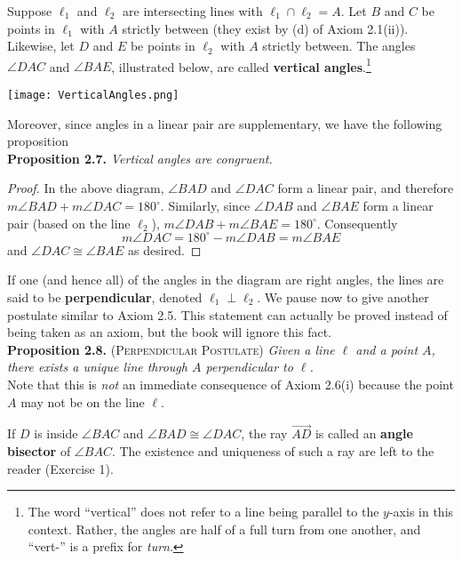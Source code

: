\documentclass[leqno]{book}
\begin{document}
Suppose $\ell_1$ and $\ell_2$ are intersecting lines with $\ell_1\cap\ell_2=A$.  Let $B$ and $C$ be points in $\ell_1$ with $A$ strictly between (they exist by (d) of Axiom 2.1(ii)).  Likewise, let $D$ and $E$ be points in $\ell_2$ with $A$ strictly between.  The angles $\angle DAC$ and $\angle BAE$, illustrated below, are called \textbf{vertical angles}.\footnote{The word ``vertical'' does not refer to a line being parallel to the $y$-axis in this context.  Rather, the angles are half of a full turn from one another, and ``vert-'' is a prefix for \emph{turn}.}
\begin{center}\texttt{[image: VerticalAngles.png]}\end{center}
Moreover, since angles in a linear pair are supplementary, we have the following proposition\\

\noindent\textbf{Proposition 2.7.} \emph{Vertical angles are congruent.}\\
\begin{proof}
In the above diagram, $\angle BAD$ and $\angle DAC$ form a linear pair, and therefore $m\angle BAD+m\angle DAC=180^\circ$.  Similarly, since $\angle DAB$ and $\angle BAE$ form a linear pair (based on the line $\ell_2$), $m\angle DAB+m\angle BAE=180^\circ$.  Consequently
$$m\angle DAC=180^\circ-m\angle DAB=m\angle BAE$$
and $\angle DAC\cong\angle BAE$ as desired.
\end{proof}

\noindent If one (and hence all) of the angles in the diagram are right angles, the lines are said to be \textbf{perpendicular}, denoted $\ell_1\perp\ell_2$.  We pause now to give another postulate similar to Axiom 2.5.  This statement can actually be proved instead of being taken as an axiom, but the book will ignore this fact.\\ %

\noindent\textbf{Proposition 2.8.} \textsc{(Perpendicular Postulate)} \emph{Given a line $\ell$ and a point $A$, there exists a unique line through $A$ perpendicular to $\ell$.}\\

\noindent Note that this is \emph{not} an immediate consequence of Axiom 2.6(i) because the point $A$ may not be on the line $\ell$.

If $D$ is inside $\angle BAC$ and $\angle BAD\cong\angle DAC$, the ray $\overset{\longrightarrow}{AD}$ is called an \textbf{angle bisector} of $\angle BAC$.  The existence and uniqueness of such a ray are left to the reader (Exercise 1).\\
\end{document}
